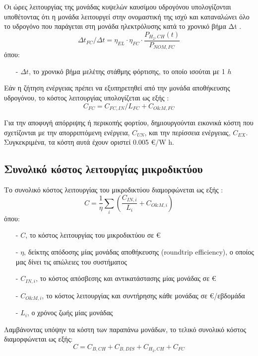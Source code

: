 Οι ώρες λειτουργίας της μονάδας κυψελών καυσίμου υδρογόνου υπολογίζονται υποθέτοντας ότι η μονάδα λειτουργεί στην ονομαστική της ισχύ και καταναλώνει όλο το υδρογόνο που παράγεται στη μονάδα ηλεκτρόλυσης κατά το χρονικό βήμα Δt \cite{CAU2014820}.
\begin{equation}
    Δt_{FC}/Δt = η_{EL} \cdot η_{FC} \cdot \frac{P_{H_2,CH}(t)}{P_{NOM,FC}}
\end{equation}
όπου:
\begin{itemize}
 \item[-] $Δt$, το χρονικό βήμα μελέτης στάθμης φόρτισης, το οποίο ισούται με 1 $h$
\end{itemize}

Εάν η ζήτηση ενέργειας πρέπει να εξυπηρετηθεί από την μονάδα αποθήκευσης υδρογόνου, το κόστος λειτουργίας υπολογίζεται ως εξής \cite{CAU2014820}:
\begin{equation}
    C_{FC} = C_{FC,IN}/L_{FC} + C_{O\&M,FC}
\end{equation}

Για την αποφυγή απόρριψης ή περικοπής φορτίου, δημιουργούνται εικονικά κόστη που σχετίζονται με την απορριπτόμενη ενέργεια, $C_{UN}$, και την περίσσεια ενέργειας, $C_{EX}$. Συγκεκριμένα, τα κόστη αυτά έχουν οριστεί 0.005 €/W h.

\subsection{Συνολικό κόστος λειτουργίας μικροδικτύου}
Το συνολικό κόστος λειτουργίας του μικροδικτύου διαμορφώνεται ως εξής \cite{CAU2014820}:
\begin{equation}
    C=\frac{1}{η} \sum_{i} (\frac{C_{IN,i}}{L_i} + C_{O\&M,i}) 
\end{equation}
όπου:
\begin{itemize}
  \item[-] $C$, το κόστος λειτουργίας του μικροδικτύου σε €
  \item[-] $η$, δείκτης απόδοσης μίας μονάδας αποθήκευσης (roundtrip efficiency), ο οποίος μας δίνει τις απώλειες του συστήματος
  \item[-] $C_{IN,i}$, το κόστος απόσβεσης και αντικατάστασης μίας μονάδας σε € 
  \item[-] $C_{O\&M,i}$, το κόστος λειτουργίας και συντήρησης κάθε μονάδας σε €/εβδομάδα
  \item[-] $L_i$, ο χρόνος ζωής μίας μονάδας
\end{itemize}

Λαμβάνοντας υπόψην τα κόστη των παραπάνω μονάδων, το τελικό συνολικό κόστος διαμορφώνεται ως εξής:
\begin{equation}
    C=C_{B,CH}+C_{B,DIS}+ C_{H_2,CH}+C_{FC} \label{total_cost} 
\end{equation}

